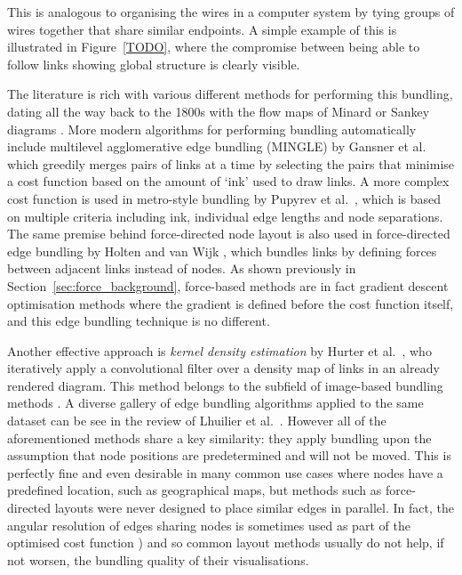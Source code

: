 This is analogous to organising the wires in a computer system by tying groups of wires together that share similar endpoints. A simple example of this is illustrated in Figure~\ref{TODO}, where the compromise between being able to follow links showing global structure is clearly visible.

The literature is rich with various different methods for performing this bundling, dating all the way back to the 1800s with the flow maps of Minard \cite{Minard1862} or Sankey diagrams \cite{Sankey1896}.
More modern algorithms for performing bundling automatically include multilevel agglomerative edge bundling (MINGLE) by Gansner et al.~\cite{Gansner2011} which greedily merges pairs of links at a time by selecting the pairs that minimise a cost function based on the amount of `ink' used to draw links. A more complex cost function is used in metro-style bundling by Pupyrev et al.~\cite{Pupyrev2016}, which is based on multiple criteria including ink, individual edge lengths and node separations. 
The same premise behind force-directed node layout is also used in force-directed edge bundling by Holten and van Wijk \cite{Holten2009}, which bundles links by defining forces between adjacent links instead of nodes. As shown previously in Section~\ref{sec:force_background}, force-based methods are in fact gradient descent optimisation methods where the gradient is defined before the cost function itself, and this edge bundling technique is no different.

Another effective approach is \emph{kernel density estimation} by Hurter et al.~\cite{Hurter2012}, who iteratively apply a convolutional filter over a density map of links in an already rendered diagram. This method belongs to the subfield of image-based bundling methods \cite{Lhuillier2017,Telea2018}. A diverse gallery of edge bundling algorithms applied to the same dataset can be see in the review of Lhuilier et al.~\cite[Fig.~4]{Lhuillier2017}.
However all of the aforementioned methods share a key similarity: they apply bundling upon the assumption that node positions are predetermined and will not be moved. This is perfectly fine and even desirable in many common use cases where nodes have a predefined location, such as geographical maps, but methods such as force-directed layouts were never designed to place similar edges in parallel. In fact, the angular resolution of edges sharing nodes is sometimes used as part of the optimised cost function \cite{Argyriou2010}) and so common layout methods usually do not help, if not worsen, the bundling quality of their visualisations.

